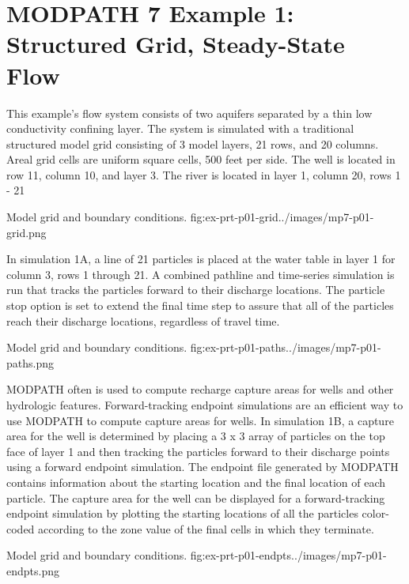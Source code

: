\section{MODPATH 7 Example 1: Structured Grid, Steady-State Flow}

This example's flow system consists of two aquifers separated by a thin low conductivity confining layer. The system is simulated with a traditional structured model grid consisting of 3 model layers, 21 rows, and 20 columns. Areal grid cells are uniform square cells, 500 feet per side. The well is located in row 11, column 10, and layer 3. The river is located in layer 1, column 20, rows 1 - 21

\begin{StandardFigure}{
    Model grid and boundary conditions.
    }{fig:ex-prt-p01-grid}{../images/mp7-p01-grid.png}
\end{StandardFigure}

In simulation 1A, a line of 21 particles is placed at the water table in layer 1 for column 3, rows 1 through 21. A combined pathline and time-series simulation is run that tracks the particles forward to their discharge locations. The particle stop option is set to extend the final time step to assure that all of the particles reach their discharge locations, regardless of travel time.

\begin{StandardFigure}{
    Model grid and boundary conditions.
    }{fig:ex-prt-p01-paths}{../images/mp7-p01-paths.png}
\end{StandardFigure}

MODPATH often is used to compute recharge capture areas for wells and other hydrologic features. Forward-tracking endpoint simulations are an efficient way to use MODPATH to compute capture areas for wells. In simulation 1B, a capture area for the well is determined by placing a 3 x 3 array of particles on the top face of layer 1 and then tracking the particles forward to their discharge points using a forward endpoint simulation. The endpoint file generated by MODPATH contains information about the starting location and the final location of each particle. The capture area for the well can be displayed for a forward-tracking endpoint simulation by plotting the starting locations of all the particles color-coded according to the zone value of the final cells in which they terminate.

\begin{StandardFigure}{
    Model grid and boundary conditions.
    }{fig:ex-prt-p01-endpts}{../images/mp7-p01-endpts.png}
\end{StandardFigure}

